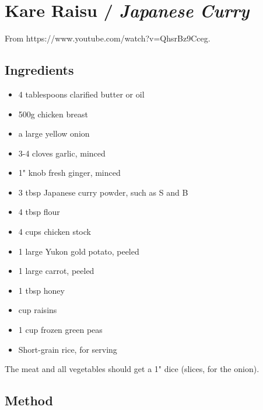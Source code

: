 \section{Kare Raisu / \emph{Japanese Curry}}


From https://www.youtube.com/watch?v=QhsrBz9Cceg.

\subsection{Ingredients}

\begin{itemize}
	\item 4 tablespoons clarified butter or oil
	\item 500g chicken breast
	\item {} a large yellow onion
	\item 3-4 cloves garlic, minced
	\item 1" knob fresh ginger, minced
	\item 3 tbsp Japanese curry powder, such as S and B
	\item 4 tbsp flour
	\item 4 cups chicken stock
	\item 1 large Yukon gold potato, peeled
	\item 1 large carrot, peeled
	\item 1 tbsp honey
	\item {} cup raisins
	\item 1 cup frozen green peas
	\item Short-grain rice, for serving
\end{itemize}

The meat and all vegetables should get a 1" dice (slices, for the onion).

\subsection{Method}

